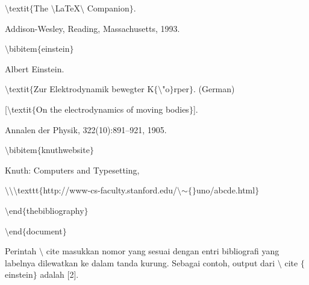 \begin{itemize}
\hspace*{0.5in}$\setminus$textit$ \{ $The $\setminus$LaTeX$\setminus$ Companion$ \} $. \par
\vspace{\baselineskip}
\hspace*{0.5in}Addison-Wesley, Reading, Massachusetts, 1993. \par

\hspace*{0.5in}$\setminus$bibitem$ \{ $einstein$ \} $ \par
\vspace{\baselineskip}
\hspace*{0.5in}Albert Einstein. \par

\hspace*{0.5in}$\setminus$textit$ \{ $Zur Elektrodynamik bewegter K$ \{ $$\setminus$"o$ \} $rper$ \} $. (German) \par

\hspace*{0.5in}[$\setminus$textit$ \{ $On the electrodynamics of moving bodies$ \} $]. \par
\vspace{\baselineskip}
\hspace*{0.5in}Annalen der Physik, 322(10):891–921, 1905. \par

\hspace*{0.5in}$\setminus$bibitem$ \{ $knuthwebsite$ \} $ \par
\vspace{\baselineskip}
\hspace*{0.5in}Knuth: Computers and Typesetting,\par

\hspace*{0.5in}$\setminus$$\setminus$$\setminus$texttt$ \{ $http://www-cs-faculty.stanford.edu/$\setminus$$ \sim $$ \{ $$ \} $uno/abcde.html$ \} $\par

\hspace*{0.5in}$\setminus$end$ \{ $thebibliography$ \} $ \par

\hspace*{0.5in}$\setminus$end$ \{ $document$ \} $\par
\vspace{\baselineskip}
Perintah $\setminus$ cite masukkan nomor yang sesuai dengan entri bibliografi yang labelnya dilewatkan ke dalam tanda kurung. Sebagai contoh, output dari $\setminus$ cite $ \{ $einstein$ \} $ adalah [2].\par
\vspace{\baselineskip}


\end{itemize}

